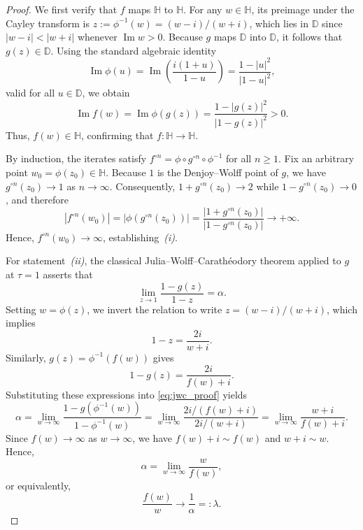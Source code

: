 \documentclass[10pt,a4paper]{amsart}
\numberwithin{equation}{section}
\begin{document}
\begin{proof}
We first verify that $f$ maps $\mathbb{H}$ to $\mathbb{H}$. For any
$w\in\mathbb{H}$, its preimage under the Cayley transform is
$z:=\phi^{-1}(w)=(w-i)/(w+i)$, which lies in $\mathbb{D}$ since
$|w-i|<|w+i|$ whenever $\operatorname{Im}w>0$. Because $g$ maps
$\mathbb{D}$ into $\mathbb{D}$, it follows that $g(z)\in\mathbb{D}$.
Using the standard algebraic identity
\begin{equation*}
\operatorname{Im}\phi(u)
=
\operatorname{Im}\!\left(\frac{i(1+u)}{1-u}\right)
=
\frac{1-|u|^2}{|1-u|^2},
\end{equation*}
valid for all $u\in\mathbb{D}$, we obtain
\begin{equation*}
\operatorname{Im}f(w)
=
\operatorname{Im}\phi(g(z))
=
\frac{1-|g(z)|^2}{|1-g(z)|^2}
>0.
\end{equation*}
Thus, $f(w)\in\mathbb{H}$, confirming that
$f:\mathbb{H}\to\mathbb{H}$.

By induction, the iterates satisfy
$f^{\circ n}=\phi\circ g^{\circ n}\circ\phi^{-1}$ for all $n\ge1$.
Fix an arbitrary point $w_0=\phi(z_0)\in\mathbb{H}$.
Because $1$ is the Denjoy--Wolff point of $g$, we have
$g^{\circ n}(z_0)\to1$ as $n\to\infty$. Consequently,
$1+g^{\circ n}(z_0)\to2$ while
$1-g^{\circ n}(z_0)\to0$, and therefore
\begin{equation*}
|f^{\circ n}(w_0)|
=
|\phi(g^{\circ n}(z_0))|
=
\frac{|1+g^{\circ n}(z_0)|}
{|1-g^{\circ n}(z_0)|}
\longrightarrow+\infty.
\end{equation*}
Hence,
$f^{\circ n}(w_0)\to\infty$,
establishing~\emph{(i)}.

For statement~\emph{(ii)}, the classical
Julia--Wolff--Carath\'eodory theorem applied to $g$ at $\tau=1$
asserts that
\begin{equation}
\label{eq:jwc_proof}
\lim_{z\to1}
\frac{1-g(z)}{1-z}
=
\alpha.
\end{equation}
Setting $w=\phi(z)$, we invert the relation to write
$z=(w-i)/(w+i)$, which implies
\begin{equation*}
1-z=\frac{2i}{w+i}.
\end{equation*}
Similarly, $g(z)=\phi^{-1}(f(w))$
gives
\begin{equation*}
1-g(z)=\frac{2i}{f(w)+i}.
\end{equation*}
Substituting these expressions into
\eqref{eq:jwc_proof} yields
\begin{equation*}
\alpha
=
\lim_{w\to\infty}
\frac{1-g(\phi^{-1}(w))}
{1-\phi^{-1}(w)}
=
\lim_{w\to\infty}
\frac{2i/(f(w)+i)}
{2i/(w+i)}
=
\lim_{w\to\infty}
\frac{w+i}{f(w)+i}.
\end{equation*}
Since $f(w)\to\infty$ as $w\to\infty$, we have
$f(w)+i\sim f(w)$ and
$w+i\sim w$. Hence,
\begin{equation*}
\alpha
=
\lim_{w\to\infty}
\frac{w}{f(w)},
\end{equation*}
or equivalently,
\begin{equation*}
\frac{f(w)}{w}\longrightarrow\frac1\alpha=:\lambda.
\end{equation*}


\end{proof}
\end{document}

